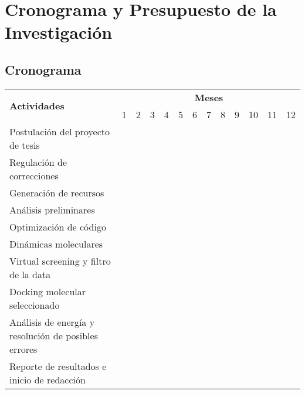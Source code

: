 \chapter{Cronograma y Presupuesto de la Investigación}

\section{Cronograma} 
\begin{table}[!htb]
\begin{center}
\begin{tabular}{|p{7cm}|c|c|c|c|c|c|c|c|c|c|c|c|}\hline
\multirow{2}{*}{\textbf{Actividades}}    & \multicolumn {12}{c|}{\textbf{Meses}} \\\cline{2-13}
                                              & 1 & 2 & 3 & 4 & 5 & 6 & 7 & 8 & 9 & 10 & 11 & 12\\\hline
 Postulación del proyecto de tesis            & \cellcolor{Mygray} &   &   &   &   &   &   &   &   &    &    &   \\\hline
 Regulación de correcciones                   & \cellcolor{Mygray} & \cellcolor{Mygray} &   &   &   &   &   &   &   &    &    &   \\\hline    
 Generación de recursos                       &   &   & \cellcolor{Mygray} & \cellcolor{Mygray}   &   &   &   &   &   &    &    &   \\\hline
 Análisis preliminares                        &   &   &   &   & \cellcolor{Mygray} &   &   &   &   &    &    &   \\\hline  
 Optimización de código                       &   &   &   &   &   & \cellcolor{Mygray} &   &   &   &    &    &   \\\hline
 Dinámicas moleculares                        &   &   &   &   &   &   & \cellcolor{Mygray} &   &   &    &    &   \\\hline  
 Virtual screening y filtro de la data        &   &   &   &   &   &   &   & \cellcolor{Mygray} &   &    &    &   \\\hline
 Docking molecular seleccionado               &   &   &   &   &   &   &   &   & \cellcolor{Mygray}   &    &    &   \\\hline  
 Análisis de energía y resolución de posibles errores &   &   &   &   &   &   &   &  & \cellcolor{Mygray} & \cellcolor{Mygray} &    &   \\\hline
 Reporte de resultados e inicio de redacción  &   &   &   &   &   &   &   &   &   &   & \cellcolor{Mygray} & \cellcolor{Mygray} \\\hline  
                                           
\end{tabular} 
\end{center}
\end{table}


